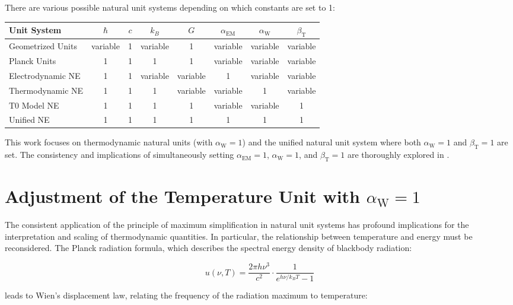 \documentclass[12pt,a4paper]{article}
\newcommand{\betaT}{\beta_{\text{T}}}
\newcommand{\alphaEM}{\alpha_{\text{EM}}}
\newcommand{\alphaW}{\alpha_{\text{W}}}
\begin{document}
	There are various possible natural unit systems depending on which constants are set to 1:
	
	\begin{center}
		\begin{tabular}{|l|c|c|c|c|c|c|c|}
			\hline
			\textbf{Unit System} & \(\hbar\) & \(c\) & \(k_B\) & \(G\) & \(\alphaEM\) & \(\alphaW\) & \(\betaT\) \\
			\hline
			Geometrized Units & variable & 1 & variable & 1 & variable & variable & variable \\
			Planck Units & 1 & 1 & 1 & 1 & variable & variable & variable \\
			Electrodynamic NE & 1 & 1 & variable & variable & 1 & variable & variable \\
			Thermodynamic NE & 1 & 1 & 1 & variable & variable & 1 & variable \\
			T0 Model NE & 1 & 1 & 1 & 1 & variable & variable & 1 \\
			Unified NE & 1 & 1 & 1 & 1 & 1 & 1 & 1 \\
			\hline
		\end{tabular}
	\end{center}
	
	This work focuses on thermodynamic natural units (with \(\alphaW = 1\)) and the unified natural unit system where both \(\alphaW = 1\) and \(\betaT = 1\) are set. The consistency and implications of simultaneously setting \(\alphaEM = 1\), \(\alphaW = 1\), and \(\betaT = 1\) are thoroughly explored in \cite{pascher_alphabeta_2025}.
	
	\section{Adjustment of the Temperature Unit with \(\alphaW = 1\)}
	
	The consistent application of the principle of maximum simplification in natural unit systems has profound implications for the interpretation and scaling of thermodynamic quantities. In particular, the relationship between temperature and energy must be reconsidered. The Planck radiation formula, which describes the spectral energy density of blackbody radiation:
	
	\begin{equation}
		u(\nu, T) = \frac{2\pi h \nu^3}{c^2} \cdot \frac{1}{e^{h \nu / k_B T} - 1}
	\end{equation}
	
	leads to Wien’s displacement law, relating the frequency of the radiation maximum to temperature:
	
\end{document}
